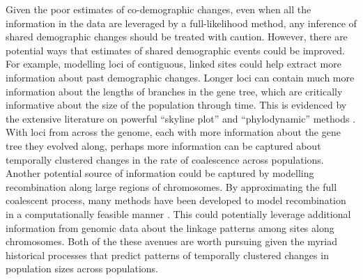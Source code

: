 Given the poor estimates of co-demographic changes, even when all the
information in the data are leveraged by a full-likelihood method, any
inference of shared demographic changes should be treated with caution.
However, there are potential ways that estimates of shared demographic
events could be improved.
For example, modelling loci of contiguous, linked sites could help
extract more information about past demographic changes.
Longer loci can contain much more information about the lengths of branches in
the gene tree, which are critically informative about the size of the
population through time.
This is evidenced by the extensive literature on powerful 
``skyline plot'' and ``phylodynamic'' methods
\citep{Pybus2000,Strimmer2001,OpgenRhein2005,Drummond2005,Heled2008,Minin2008beast,Ho2011,Palacios2012,Palacios2012UAI,Stadler2013,Gill2013,Palacios2014,Lan2015,Karcher2016,Karcher2017,Faulkner2018,Karcher2019}.
With loci from across the genome, each with more information about the gene
tree they evolved along,
perhaps more information can be captured about temporally clustered changes in
the rate of coalescence across populations.
Another potential source of information could be captured by modelling
recombination along large regions of chromosomes.
By approximating the full coalescent process, many methods have been developed
to model recombination in a computationally feasible manner
\citep{McVean2005,Marjoram2006,Chen2009,Li2011,Sheehan2013,Schiffels2014,Rasmussen2014,Palacios2015}.
This could potentially leverage additional information from genomic data about the
linkage patterns among sites along chromosomes.
Both of the these avenues are worth pursuing given the myriad historical
processes that predict patterns of temporally clustered changes in population
sizes across populations.
